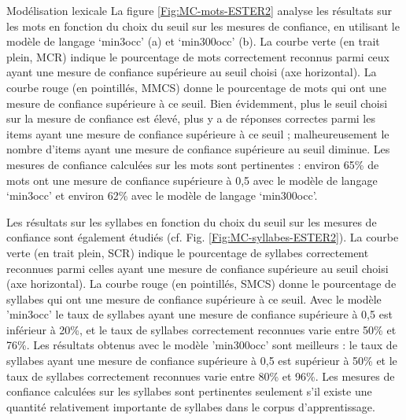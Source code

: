 \documentclass{style/these}
\begin{document}
\begin{part}{Modélisation lexicale}
La figure \ref{Fig:MC-mots-ESTER2} analyse les résultats sur les mots en fonction du choix du seuil sur les mesures de confiance, en utilisant le modèle de langage `min3occ' (a) et `min300occ' (b). 
La courbe verte (en trait plein, MCR) indique le pourcentage de mots correctement reconnus parmi ceux ayant une mesure de confiance supérieure au seuil choisi (axe horizontal). 
La courbe rouge (en pointillés, MMCS)  donne le pourcentage de mots qui ont une mesure de confiance supérieure à ce seuil. 
Bien évidemment, plus le seuil choisi sur la mesure de confiance est élevé, plus y a de réponses correctes parmi les items ayant une mesure de confiance supérieure à ce seuil ; malheureusement le nombre d'items ayant une mesure de confiance supérieure au seuil diminue. 
Les mesures de confiance calculées sur les mots sont pertinentes : environ 65\% de mots ont une mesure de confiance supérieure à 0,5 avec le modèle de langage `min3occ' et  environ 62\% avec le modèle de langage `min300occ'. 

Les résultats sur les syllabes en fonction du choix du seuil sur les mesures de confiance sont également étudiés (cf. Fig. \ref{Fig:MC-syllabes-ESTER2}).
La courbe verte (en trait plein, SCR) indique le pourcentage de syllabes correctement reconnues parmi celles ayant une mesure de confiance supérieure au seuil choisi (axe horizontal). 
La courbe rouge (en pointillés, SMCS) donne le pourcentage de syllabes qui ont une mesure de confiance supérieure à ce seuil. 
Avec le modèle 'min3occ' le taux de syllabes ayant une mesure de confiance supérieure à 0,5 est inférieur à 20\%, et le taux de syllabes correctement reconnues varie entre 50\% et 76\%.  
Les résultats obtenus avec le modèle 'min300occ' sont meilleurs : le taux de syllabes ayant une mesure de confiance supérieure à 0,5 est supérieur à 50\% et le taux de syllabes correctement reconnues varie entre 80\% et 96\%. 
Les mesures de confiance calculées sur les syllabes sont pertinentes seulement s'il existe une quantité relativement importante de syllabes dans le corpus d'apprentissage. 


\end{part}
\end{document}
